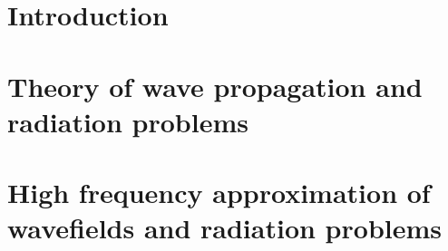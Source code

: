\documentclass[%
	paper=A4,					%
	twoside=true,				%
	openright,					%
	chapterprefix=true,			%
	11pt,						%
	headings=normal,			%
	bibliography=totoc,			%
	listof=totoc,				%
	titlepage=on,				%
	captions=tableabove,		%
	draft=false,				%
]{scrreprt}
\begin{document}
\sloppy



\pagestyle{empty}				%
\cleardoublepage

%

\cleardoublepage

\pagestyle{plain}				%
\setcounter{tocdepth}{2}		%
\tableofcontents				%
\cleardoublepage
{}			%
\setcounter{page}{1}			%
\pagestyle{maincontentstyle} 	%

%

\chapter{Introduction}
%
%
\chapter{Theory of wave propagation and radiation problems}
\label{sec:general_wave_theory}

%
\chapter{High frequency approximation of wavefields and radiation problems}
\label{sec:high_freq_approx}

%
%
%
%
%
%
\end{document}
